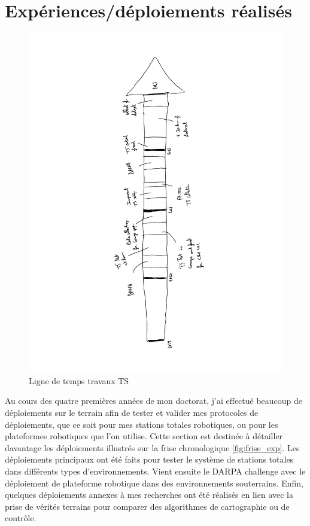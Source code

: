 \section{Expériences/déploiements réalisés}
\label{sec:experiences_faites}

\begin{figure}[!t]
    \centering
    \includegraphics[width=\linewidth, angle=0, trim={0 0 0 0},clip]{figs/TS_timeline.pdf}
    \caption{Ligne de temps travaux TS}
    \label{fig:frise_exp}
\end{figure}

Au cours des quatre premières années de mon doctorat, j'ai effectué beaucoup de déploiements sur le terrain afin de tester et valider mes protocoles de déploiements, que ce soit pour mes stations totales robotiques, ou pour les plateformes robotiques que l'on utilise.
Cette section est destinée à détailler davantage les déploiements  illustrés sur la frise chronologique \autoref{fig:frise_exp}.
Les déploiements principaux ont été faits pour tester le système de stations totales dans différents types d'environnements.
Vient ensuite le DARPA challenge avec le déploiement de plateforme robotique dans des environnements souterrains.
Enfin, quelques déploiements annexes à mes recherches ont été réalisés en lien avec la prise de vérités terrains pour comparer des algorithmes de cartographie ou de contrôle.

